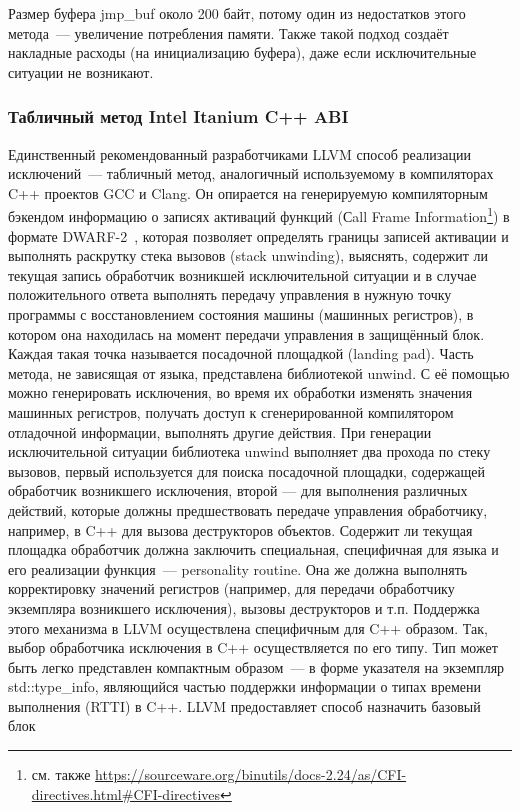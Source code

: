 \documentclass[a4paper, 12pt]{article}
\begin{document}
Размер буфера jmp\_buf около 200 байт, потому один из недостатков этого метода~--- увеличение
потребления памяти. Также такой подход создаёт накладные расходы (на инициализацию буфера), даже если исключительные
ситуации не возникают.

\subsubsection{Табличный метод Intel Itanium C++ ABI}
Единственный рекомендованный разработчиками LLVM способ реализации исключений~--- табличный метод, аналогичный
используемому в компиляторах C++ проектов GCC и Clang. Он опирается на генерируемую компиляторным бэкендом информацию
о записях активаций функций (Сall Frame Information\footnote{см. также
\url{https://sourceware.org/binutils/docs-2.24/as/CFI-directives.html\#CFI-directives}}) в формате DWARF-2~\cite{DWARF},
которая позволяет определять границы записей активации и выполнять раскрутку стека вызовов (stack unwinding), выяснять,
содержит ли текущая запись обработчик возникшей исключительной ситуации и в случае положительного ответа выполнять
передачу управления в нужную точку программы с восстановлением состояния машины (машинных регистров), в котором она
находилась на момент передачи управления в защищённый блок. Каждая такая точка называется посадочной площадкой (landing
pad). Часть метода, не зависящая от языка, представлена библиотекой unwind. С её помощью можно генерировать исключения,
во время их обработки изменять значения машинных регистров, получать доступ к сгенерированной компилятором отладочной
информации, выполнять другие действия. При генерации исключительной ситуации библиотека unwind выполняет два прохода по
стеку вызовов, первый используется для поиска посадочной площадки, содержащей обработчик возникшего исключения, второй
--- для выполнения различных действий, которые должны предшествовать передаче управления обработчику, например, в C++
для вызова деструкторов объектов. Содержит ли текущая площадка обработчик должна заключить специальная, специфичная для
языка и его реализации функция~---  personality routine. Она же должна выполнять корректировку значений регистров
(например, для передачи обработчику экземпляра возникшего исключения), вызовы деструкторов и т.п. Поддержка этого
механизма в LLVM осуществлена специфичным для C++ образом. Так, выбор обработчика исключения в C++ осуществляется по его
типу. Тип может быть легко представлен компактным образом~--- в форме указателя на экземпляр std::type\_info, являющийся
частью поддержки информации о типах времени выполнения (RTTI) в C++. LLVM предоставляет способ назначить базовый блок
\end{document}
